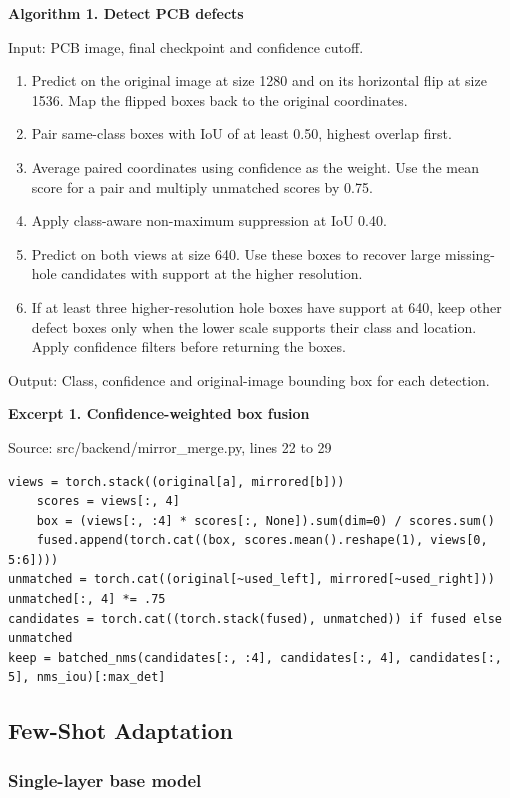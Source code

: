 \documentclass[conference]{IEEEtran}
\begin{document}
\noindent\textbf{Algorithm 1. Detect PCB defects}\par
Input: PCB image, final checkpoint and confidence cutoff.
\begin{enumerate}
\item Predict on the original image at size 1280 and on its horizontal flip
  at size 1536. Map the flipped boxes back to the original coordinates.
\item Pair same-class boxes with IoU of at least 0.50, highest overlap first.
\item Average paired coordinates using confidence as the weight. Use the mean
  score for a pair and multiply unmatched scores by 0.75.
\item Apply class-aware non-maximum suppression at IoU 0.40.
\item Predict on both views at size 640. Use these boxes to recover large
  missing-hole candidates with support at the higher resolution.
\item If at least three higher-resolution hole boxes have support at 640,
  keep other defect boxes only when the lower scale supports their class
  and location. Apply confidence filters before returning the boxes.
\end{enumerate}
\noindent Output: Class, confidence and original-image bounding box for each detection.

\textbf{Excerpt 1. Confidence-weighted box fusion}

Source: src/backend/mirror\_merge.py, lines 22 to 29

\begin{Verbatim}[fontsize=\scriptsize,breaklines=true,breakanywhere=true]
    views = torch.stack((original[a], mirrored[b]))
    scores = views[:, 4]
    box = (views[:, :4] * scores[:, None]).sum(dim=0) / scores.sum()
    fused.append(torch.cat((box, scores.mean().reshape(1), views[0, 5:6])))
unmatched = torch.cat((original[~used_left], mirrored[~used_right]))
unmatched[:, 4] *= .75
candidates = torch.cat((torch.stack(fused), unmatched)) if fused else unmatched
keep = batched_nms(candidates[:, :4], candidates[:, 4], candidates[:, 5], nms_iou)[:max_det]
\end{Verbatim}

\subsection{Few-Shot Adaptation}

\subsubsection{Single-layer base model}
\end{document}
